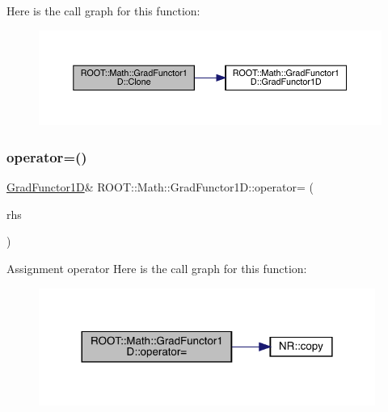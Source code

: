 Here is the call graph for this function\+:
\nopagebreak
\begin{figure}[H]
\begin{center}
\leavevmode
\includegraphics[width=350pt]{d3/d76/classROOT_1_1Math_1_1GradFunctor1D_ab8280aaf240a374fb7a67808d858af79_cgraph}
\end{center}
\end{figure}
\mbox{\label{classROOT_1_1Math_1_1GradFunctor1D_a3ea006d92100ba76a6fae9f57499c60d}} 
\subsubsection{\texorpdfstring{operator=()}{operator=()}\hspace{0.1cm}{\footnotesize\ttfamily [1/3]}}
{\footnotesize\ttfamily \mbox{\hyperlink{classROOT_1_1Math_1_1GradFunctor1D}{Grad\+Functor1D}}\& R\+O\+O\+T\+::\+Math\+::\+Grad\+Functor1\+D\+::operator= (\begin{DoxyParamCaption}\item[{const \mbox{\hyperlink{classROOT_1_1Math_1_1GradFunctor1D}{Grad\+Functor1D}} \&}]{rhs }\end{DoxyParamCaption})\hspace{0.3cm}{\ttfamily [inline]}}

Assignment operator Here is the call graph for this function\+:
\nopagebreak
\begin{figure}[H]
\begin{center}
\leavevmode
\includegraphics[width=312pt]{d3/d76/classROOT_1_1Math_1_1GradFunctor1D_a3ea006d92100ba76a6fae9f57499c60d_cgraph}
\end{center}
\end{figure}
\mbox{\label{classROOT_1_1Math_1_1GradFunctor1D_a3ea006d92100ba76a6fae9f57499c60d}} 
